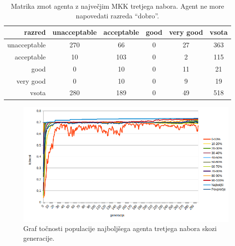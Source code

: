 \begin{table}[H]
    \centering
    \begin{tabular}{||rccccc||}
        \hline
        razred       & unacceptable & acceptable & good & very good & vsota \\ \hline
        unacceptable & 270          & 66         & 0    & 27        & 363   \\ \hline
        acceptable   & 10           & 103        & 0    & 2         & 115   \\ \hline
        good         & 0            & 10         & 0    & 11        & 21    \\ \hline
        very good    & 0            & 10         & 0    & 9         & 19    \\ \hline
        vsota        & 280          & 189        & 0    & 49        & 518   \\ \hline
    \end{tabular}
    \caption{Matrika zmot agenta z največjim MKK tretjega nabora. Agent ne more napovedati razreda \enquote{dobro}.}
    \label{tab:car_mcc_3}
\end{table}

\begin{figure}[H]
    \begin{center}
        \includegraphics[width=13cm]{car/3/acc}
    \end{center}
    \caption{Graf točnosti populacije najboljšega agenta tretjega nabora skozi generacije.}
    \label{fig:car_acc_3}
\end{figure}

